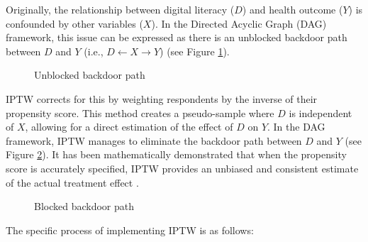 Originally, the relationship between digital literacy ($D$) and health outcome ($Y$) is confounded by other variables ($X$). In the Directed Acyclic Graph (DAG) framework, this issue can be expressed as there is an unblocked backdoor path between $D$ and $Y$ (i.e., $D \leftarrow X \rightarrow Y$) (see Figure \ref{fig:backdoor}). 

\begin{figure}[h!]
    \centering
    \caption{Unblocked backdoor path}
    \label{fig:backdoor}
\end{figure}

IPTW corrects for this by weighting respondents by the inverse of their propensity score. This method creates a pseudo-sample where $D$ is independent of $X$, allowing for a direct estimation of the effect of $D$ on $Y$. In the DAG framework, IPTW manages to eliminate the backdoor path between $D$ and $Y$ (see Figure \ref{fig:blocked}). It has been mathematically demonstrated that when the propensity score is accurately specified, IPTW provides an unbiased and consistent estimate of the actual treatment effect \parencite{lunceford_stratification_2004}.

\begin{figure}[h!]
    \centering
    \caption{Blocked backdoor path}
    \label{fig:blocked}
\end{figure}

The specific process of implementing IPTW is as follows:

